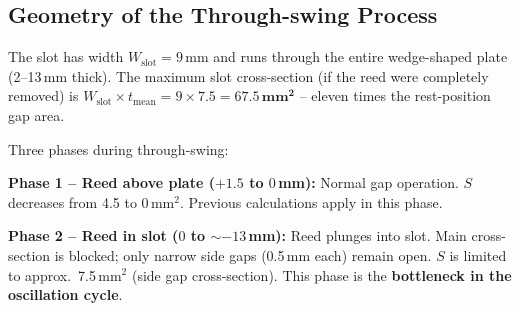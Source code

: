 \documentclass[11pt,a4paper]{article}
\begin{document}
\subsection{Geometry of the Through-swing Process}

The slot has width $W_\text{slot} = 9$\,mm and runs through the entire wedge-shaped plate (2--13\,mm thick). The maximum slot cross-section (if the reed were completely removed) is $W_\text{slot} \times t_\text{mean} = 9 \times 7.5 = \mathbf{67.5\,\text{mm}^2}$ -- eleven times the rest-position gap area.

Three phases during through-swing:

\begin{table}[H]
\centering\small
{}
\caption{Effective flow cross-section at various tip positions}
\end{table}

\textbf{Phase 1 -- Reed above plate ($+1.5$ to $0$\,mm):} Normal gap operation. $S$ decreases from 4.5 to 0\,mm$^2$. Previous calculations apply in this phase.

\textbf{Phase 2 -- Reed in slot ($0$ to $\sim$$-13$\,mm):} Reed plunges into slot. Main cross-section is blocked; only narrow side gaps (0.5\,mm each) remain open. $S$ is limited to approx.\ 7.5\,mm$^2$ (side gap cross-section). This phase is the \textbf{bottleneck in the oscillation cycle}.
\end{document}
